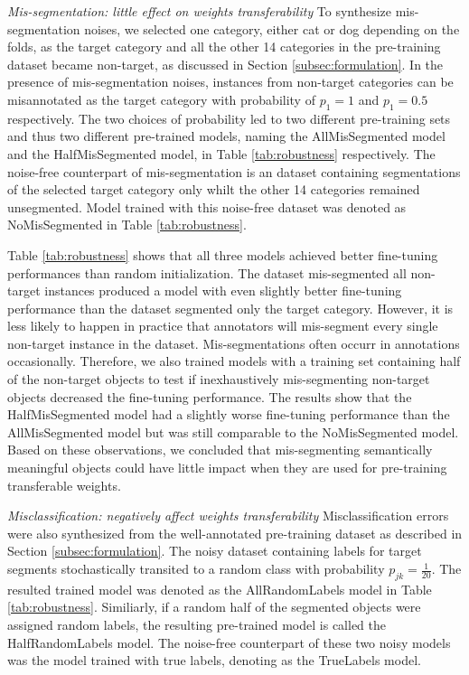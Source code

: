 \noindent \textit{Mis-segmentation: little effect on weights transferability}
\noindent
To synthesize mis-segmentation noises, we selected one category, either cat or dog depending on the folds, as the target category and all the other 14 categories in the pre-training dataset became non-target, as discussed in Section \ref{subsec:formulation}.
In the presence of mis-segmentation noises, instances from non-target categories can be misannotated as the target category with probability of $p_{1} = 1$ and $p_{1}= 0.5$ respectively.
The two choices of probability led to two different pre-training sets and thus two different pre-trained models, naming the AllMisSegmented model and the HalfMisSegmented model, in Table \ref{tab:robustness} respectively.
The noise-free counterpart of mis-segmentation is an dataset containing segmentations of the selected target category only whilt the other 14 categories remained unsegmented.
Model trained with this noise-free dataset was denoted as NoMisSegmented in Table \ref{tab:robustness}.

\noindent
Table \ref{tab:robustness} shows that all three models achieved better fine-tuning performances than random initialization.
The dataset mis-segmented all non-target instances produced a model with even slightly better fine-tuning performance than the dataset segmented only the target category.
However, it is less likely to happen in practice that annotators will mis-segment every single non-target instance in the dataset.
Mis-segmentations often occurr in annotations occasionally.
Therefore, we also trained models with a training set containing half of the non-target objects to test if inexhaustively mis-segmenting non-target objects decreased the fine-tuning performance.
The results show that the HalfMisSegmented model had a slightly worse fine-tuning performance than the AllMisSegmented model but was still comparable to the NoMisSegmented model.
Based on these observations, we concluded that mis-segmenting semantically meaningful objects could have little impact when they are used for pre-training transferable weights.

\noindent \textit{Misclassification: negatively affect weights transferability}
\noindent
Misclassification errors were also synthesized from the well-annotated pre-training dataset as described in Section \ref{subsec:formulation}.
The noisy dataset containing labels for target segments stochastically transited to a random class with probability $p_{jk}=\frac{1}{20}$.
The resulted trained model was denoted as the AllRandomLabels model in Table \ref{tab:robustness}.
Similiarly, if a random half of the segmented objects were assigned random labels, the resulting pre-trained model is called the HalfRandomLabels model.
The noise-free counterpart of these two noisy models was the model trained with true labels, denoting as the TrueLabels model.

